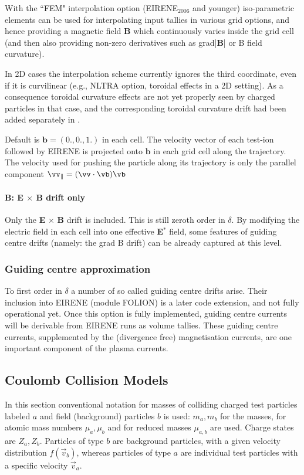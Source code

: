 With the  ``FEM" interpolation option (EIRENE$_{2006}$ and younger) iso-parametric elements can be used
for interpolating input tallies in various grid options, and hence providing a magnetic field $\textbf{B}$ which continuously varies
inside the grid cell (and then also providing non-zero derivatives such as grad|$\textbf{B}$| or B field curvature).

In 2D cases the interpolation scheme currently ignores the third coordinate,
even if it is curvilinear (e.g., NLTRA option, toroidal effects in a 2D setting).
As a consequence toroidal curvature effects are not yet properly
seen by charged particles in that case, and the corresponding toroidal curvature drift had been added
separately in \cite{kn:Seebacher}.

Default is $\textbf{b}=(0.,0.,1.)$ in each cell.
The velocity vector of each test-ion followed by EIRENE is projected onto $\textbf{b}$
in each grid cell along the trajectory. The velocity used for pushing the particle along
its trajectory is only the parallel component $\vv_\|=(\vv \cdot \vb) \vb$
\paragraph{B: \textbf{E} $\times$ \textbf{B} drift only\\}
\noindent
Only the \textbf{E} $\times$ \textbf{B} drift is included.
This is still zeroth order in $\delta$.
By modifying the electric field
in each cell into one effective \textbf{E$^*$} field, some features of  guiding centre drifts
(namely: the grad B drift) can be already captured at this level.
\subsubsection{Guiding centre approximation}
To first order in $\delta$ a number of so called guiding centre drifts arise. Their inclusion
into EIRENE (module FOLION) is a later code extension, and not fully operational yet.
Once this option is fully implemented, guiding centre currents will be derivable from EIRENE runs
as volume tallies. These guiding centre currents, supplemented by the (divergence free)
magnetisation currents, are one important component of the plasma currents.
\subsection{Coulomb Collision Models}
In this section conventional notation for masses of colliding charged test particles labeled $a$ and field (background) particles $b$
is used:   $m_a, m_b$ for the masses,
for atomic mass numbers
$\mu_a, \mu_b$ and for reduced
masses $\mu_{a,b}$ are used. Charge states are $Z_a, Z_b$. Particles of type $b$ are background particles,
with a given velocity distribution $f(\vec v_b)$, whereas particles of type $a$ are individual test particles with a specific
velocity $\vec v_a$.


